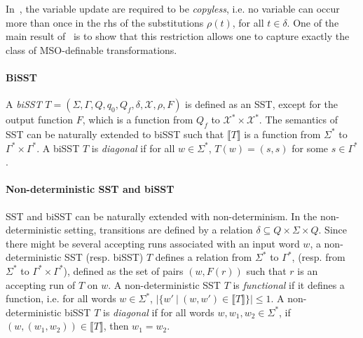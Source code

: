\documentclass{llncs}
\newcommand\inter[1]{\llbracket #1 \rrbracket}
\newcommand{\Vars}{\mathcal{X}}
\begin{document}
In~\cite{AC10}, the variable update are required to be
\emph{copyless}, i.e. no variable can occur more than once in the rhs of the
substitutions $\rho(t)$, for all $t\in \delta$. One of the main result
of~\cite{AC10} is to show that this restriction allows one to capture
exactly the class of MSO-definable transformations. 

\paragraph{BiSST} A \emph{biSST} $T = (\Sigma, \Gamma, Q, q_0, Q_f,
\delta, \Vars, \rho, F)$ is defined as an SST, except for the output
function $F$, which is a function from $Q_f$ to $\Vars^*\times
\Vars^*$. The semantics of SST can be naturally extended to biSST such
that $\inter{T}$ is a function from $\Sigma^*$ to $\Gamma^*\times
\Gamma^*$. A biSST $T$ is \emph{diagonal} if for all $w\in\Sigma^*$,
$T(w) = (s,s)$ for some $s\in\Gamma^*$.  


\paragraph{Non-deterministic SST and biSST} SST and biSST can be
naturally extended with non-determinism. In the non-deterministic
setting, transitions are defined by a relation $\delta\subseteq
Q\times \Sigma \times Q$. Since there might be several accepting runs
associated with an input word $w$, a non-deterministic SST
(resp. biSST) $T$ defines a relation from $\Sigma^*$ to $\Gamma^*$,
(resp. from $\Sigma^*$ to $\Gamma^*{\times}\Gamma^*$), defined as the 
set of pairs $(w,F(r))$ such that $r$ is an accepting run of $T$ on
$w$. A non-deterministic SST $T$ is \emph{functional} if it defines a
function, i.e. for all words $w\in\Sigma^*$, $|\{ w'\ |\
(w,w')\in\inter{T}\}|\leq 1$. A non-deterministic biSST $T$ is
\emph{diagonal} if for all words $w,w_1,w_2\in \Sigma^*$, if 
$(w,(w_1,w_2))\in\inter{T}$, then $w_1=w_2$. 
\end{document}
